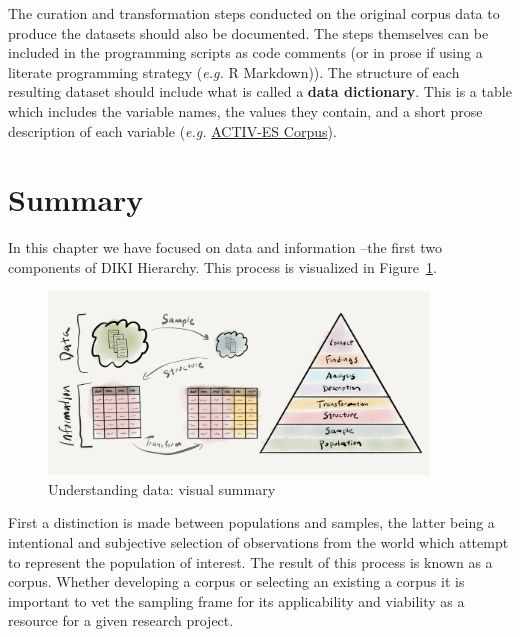 \documentclass[
  letterpaper,
]{latex/krantz}
\begin{document}
The curation and transformation steps conducted on the original corpus
data to produce the datasets should also be documented. The steps
themselves can be included in the programming scripts as code comments
(or in prose if using a literate programming strategy (\emph{e.g.} R
Markdown)). The structure of each resulting dataset should include what
is called a \textbf{data dictionary}. This is a table which includes the
variable names, the values they contain, and a short prose description
of each variable (\emph{e.g.} \href{https://osf.io/9jafz/}{ACTIV-ES
Corpus}).

\hypertarget{summary-2}{%
\section*{Summary}\label{summary-2}}


In this chapter we have focused on data and information --the first two
components of DIKI Hierarchy. This process is visualized in
Figure~\ref{fig-understanding-data-vis-sum}.

\begin{figure}[h]

{\centering \includegraphics[width=0.9\textwidth,height=\textheight]{./figures/understanding-data/understanding-data_visual-summary-paper.png}

}

\caption{\label{fig-understanding-data-vis-sum}Understanding data:
visual summary}

\end{figure}

First a distinction is made between populations and samples, the latter
being a intentional and subjective selection of observations from the
world which attempt to represent the population of interest. The result
of this process is known as a corpus. Whether developing a corpus or
selecting an existing a corpus it is important to vet the sampling frame
for its applicability and viability as a resource for a given research
project.
\end{document}
